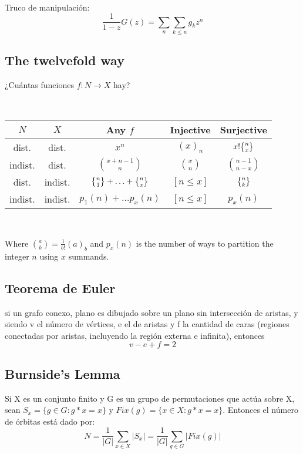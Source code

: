 \ 

Truco de manipulación:
\begin{equation*}
  \frac{1}{1-z}G(z) = \sum_{n}\sum_{k\leq n}g_kz^n
\end{equation*}

\subsection{The twelvefold way} ¿Cuántas funciones $f \colon N \rightarrow X$ hay?

\ 

\begin{tabular}{|c|c|c|c|c|}
  \hline
  $N$ & $X$ & Any $f$ & Injective & Surjective \\ \hline
  dist. & dist. & $x^n$ & $(x)_n$ & $x! \stirlingsecond{n}{x}$ \\ \hline
  indist. & dist. & $\binom{x+n-1}{n}$ & $\binom{x}{n}$ & $\binom{n-1}{n-x}$ \\ \hline
  dist. & indist. & $\stirlingsecond{n}{1} + \ldots + \stirlingsecond{n}{x}$ & $[n \leq x]$ & $\stirlingsecond{n}{k}$ \\ \hline
  indist. & indist. & $p_1(n) + \ldots p_x(n)$ & $[n \leq x]$ & $p_x(n)$ \\ \hline
\end{tabular}

\ 

Where $\binom{a}{b} = \frac{1}{b!}(a)_b $ and $p_x(n)$ is the number of ways to partition the integer $n$ using $x$ summands.

\subsection{Teorema de Euler} si un grafo conexo, plano es dibujado sobre un plano sin intersección de aristas,
y siendo v el número de vértices, e el de aristas y f la cantidad de caras (regiones conectadas por aristas,
incluyendo la región externa e infinita), entonces
\begin{equation*}
v-e+f = 2
\end{equation*}

\subsection{Burnside's Lemma} Si X es un conjunto finito y G es un grupo de permutaciones que actúa sobre X, sean
$S_x = \{g \in G:g*x=x\}$ y $Fix(g) = \{x \in X:g*x=x\}$. Entonces el número de órbitas está dado por:
\begin{equation*}
N = \frac{1}{|G|}\sum_{x \in X}|S_x| = \frac{1}{|G|}\sum_{g \in G}|Fix(g)|
\end{equation*}

